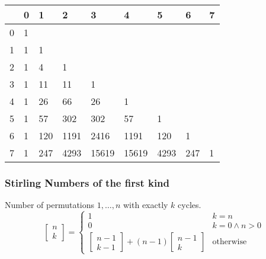 \begin{center}
	\begin{tabular}{ |l||l|l|l|l|l|l|l|l| } 
		\hline
		\diagbox{$n$}{$k$} & 0 & 1 & 2 & 3 & 4 & 5 & 6 & 7  \\
		\hline\hline
		0 &  1 &     &      &       &        &       &      &    \\
		1 &  1 & 1   &      &       &        &       &      &    \\
		2 &  1 & 4   & 1    &       &        &       &      &    \\
		3 &  1 & 11  & 11   & 1     &        &       &      &    \\
		4 &  1 & 26  & 66   & 26    & 1      &       &      &    \\
		5 &  1 & 57  & 302  & 302   & 57     & 1     &      &    \\
		6 &  1 & 120 & 1191 & 2416  & 1191   & 120   & 1    &    \\
		7 &  1 & 247 & 4293 & 15619 & 15619  & 4293  & 247  & 1  \\
		\hline
	\end{tabular}
\end{center}

\subsubsection{Stirling Numbers of the first kind}
Number of permutations $1, \dots, n$ with exactly $k$ cycles.
\begin{equation*}
  \begin{bmatrix}
    n\\k
  \end{bmatrix} =
  \begin{cases}
  	1 & k = n \\
    0 & k = 0 \land n > 0\\
    \left[
      \begin{smallmatrix}
        n - 1\\k - 1
      \end{smallmatrix}
\right] + (n - 1) \left[
  \begin{smallmatrix}
    n-1\\k
  \end{smallmatrix}
\right] & \text{otherwise}
  \end{cases}
\end{equation*}

